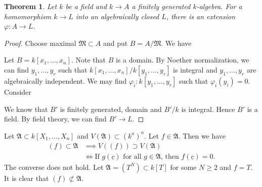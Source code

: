 \documentclass[12pt]{report}
\theoremstyle{plain}
\newtheorem{theorem}{Theorem}[section]
\theoremstyle{remark}
\theoremstyle{definition}
\begin{document}
\begin{theorem}
    Let $k$ be a field and $k\to A$ a finitely generated $k$-algebra. For a homomorphism $k\to L$ into an algebraically closed $L$, there is an extension $\varphi:A\to L$.
    \begin{figure}[H]
        \centering
    \end{figure}
\end{theorem}
\begin{proof}
    Choose maximal $\mathfrak{M}\subset A$ and put $B=A/\mathfrak{M}$. We have
    \begin{figure}[H]
        \centering
    \end{figure}
    \noindent Let $B=k[x_1,\dots,x_n]$. Note that $B$ is a domain. By Noether normalization, we can find $y_1,\dots,y_r$ such that $k[x_1,\dots,x_n]/k[y_1,\dots,y_r]$ is integral and $y_1,\dots,y_r$ are algebraically independent. We may find $\varphi_i:k[y_1,\dots,y_r]$ such that $\varphi_i(y_i)=0$. Consider
    \begin{figure}[H]
        \centering
    \end{figure}
    \noindent We know that $B'$ is finitely generated, domain and $B'/k$ is integral. Hence $B'$ is a field. By field theory, we can find $B'\to L$.
\end{proof}

Let $\mathfrak{A}\subset k[X_1,\dots,X_n]$ and $V(\mathfrak{A})\subset(k^a)^n$. Let $f\in\mathfrak{A}$. Then we have
\begin{align*}
    (f)\subset\mathfrak{A} &\implies V((f))\supset V(\mathfrak{A}) \\
    &\iff \text{If }g(\underline{c})\text{ for all }g\in\mathfrak{A}\text{, then }f(\underline{c})=0.
\end{align*}
The converse does not hold. Let $\mathfrak{A}=(T^N)\subset k[T]$ for some $N\ge 2$ and $f=T$. It is clear that $(f)\not\subset\mathfrak{A}$.
\end{document}

